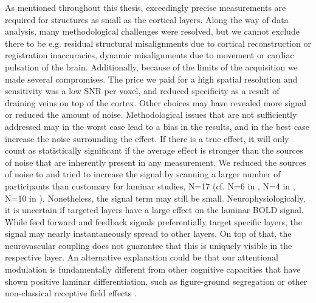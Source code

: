 As mentioned throughout this thesis, exceedingly precise measurements are required for structures as small as the cortical layers. Along the way of data analysis, many methodological challenges were resolved, but we cannot exclude there to be e.g. residual structural misalignments due to cortical reconstruction or registration inaccuracies, dynamic misalignments due to movement or cardiac pulsation of the brain. Additionally, because of the limits of the acquisition we made several compromises. The price we paid for a high spatial resolution and sensitivity was a low SNR per voxel, and reduced specificity as a result of draining veins on top of the cortex. Other choices may have revealed more signal or reduced the amount of noise. Methodological issues that are not sufficiently addressed may in the worst case lead to a bias in the results, and in the best case increase the noise surrounding the effect. If there is a true effect, it will only count as statistically significant if the average effect is stronger than the sources of noise that are inherently present in any measurement. We reduced the sources of noise to and tried to increase the signal by scanning a larger number of participants than customary for laminar studies, N=17 (cf. N=6 in \cite{Polimeni2010}, N=4 in \cite{Muckli2015}, N=10 in \cite{Kok2016}). Nonetheless, the signal term may still be small. Neurophysiologically, it is uncertain if targeted layers have a large effect on the laminar BOLD signal. While feed forward and feedback signals preferentially target specific layers, the signal may nearly instantaneously spread to other layers. On top of that, the neurovascular coupling does not guarantee that this is uniquely visible in the respective layer. An alternative explanation could be that our attentional modulation is fundamentally different from other cognitive capacities that have shown positive laminar differentiation, such as figure-ground segregation \cite{Kok2015} or other non-classical receptive field effects \cite{Muckli2015}. 

